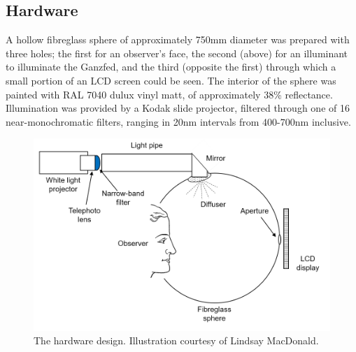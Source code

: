 \subsection{Hardware}

A hollow fibreglass sphere of approximately 750mm diameter was prepared with three holes; the first for an observer's face, the second (above) for an illuminant to illuminate the Ganzfed, and the third (opposite the first) through which a small portion of an LCD screen could be seen. The interior of the sphere was painted with RAL 7040 dulux vinyl matt, of approximately 38\% reflectance. Illumination was provided by a Kodak slide projector, filtered through one of 16 near-monochromatic filters, ranging in 20nm intervals from 400-700nm inclusive. %

\begin{figure}[htbp]
\includegraphics[max width=\textwidth]{figs/LargeSphere/sketch.png}
\caption{The hardware design. Illustration courtesy of Lindsay MacDonald.}
\label{fig:sketch}
\end{figure}

